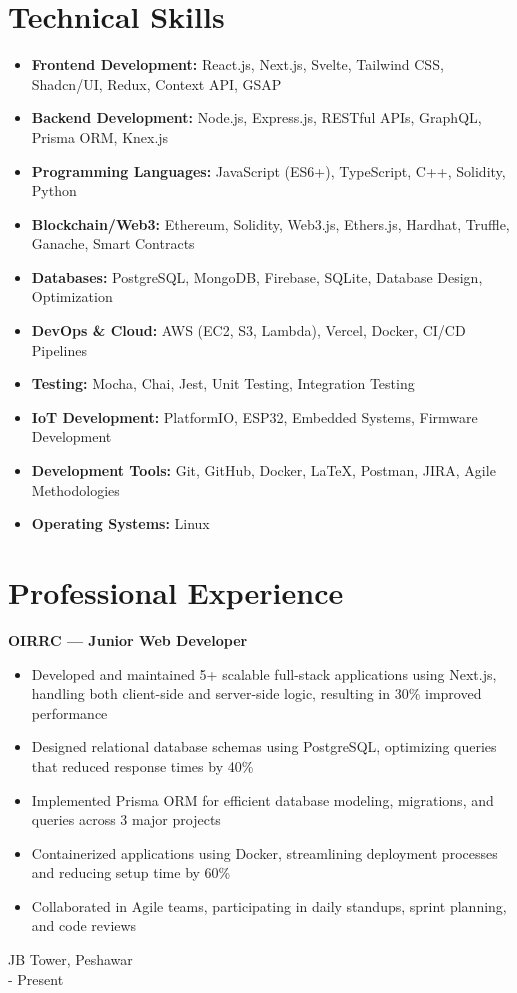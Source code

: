 \documentclass[10pt, letterpaper]{article}
\newenvironment{highlights}{
    \begin{itemize}[
        topsep=0.10 cm,
        parsep=0.10 cm,
        partopsep=0pt,
        itemsep=0pt,
        leftmargin=0.4 cm + 10pt
    ]
}{
    \end{itemize}
}
\newenvironment{twocolentry}[2][]{
    \onecolentry
    \def\secondColumn{#2}
    \setcolumnwidth{\fill, 4.5 cm}
    \begin{paracol}{2}
}{
    \switchcolumn \raggedleft \secondColumn
    \end{paracol}
    \endonecolentry
}
\begin{document}
\section{Technical Skills}
\begin{highlights}
	\item \textbf{Frontend Development:} React.js, Next.js, Svelte, Tailwind CSS, Shadcn/UI, Redux, Context API, GSAP
	\item \textbf{Backend Development:} Node.js, Express.js, RESTful APIs, GraphQL, Prisma ORM, Knex.js
	\item \textbf{Programming Languages:} JavaScript (ES6+), TypeScript, C++, Solidity, Python
	\item \textbf{Blockchain/Web3:} Ethereum, Solidity, Web3.js, Ethers.js, Hardhat, Truffle, Ganache, Smart Contracts
	\item \textbf{Databases:} PostgreSQL, MongoDB, Firebase, SQLite, Database Design, Optimization
	\item \textbf{DevOps \& Cloud:} AWS (EC2, S3, Lambda), Vercel, Docker, CI/CD Pipelines
	\item \textbf{Testing:} Mocha, Chai, Jest, Unit Testing, Integration Testing
	\item \textbf{IoT Development:} PlatformIO, ESP32, Embedded Systems, Firmware Development
	\item \textbf{Development Tools:} Git, GitHub, Docker, LaTeX, Postman, JIRA, Agile Methodologies
	\item \textbf{Operating Systems:} Linux
\end{highlights}

\section{Professional Experience}

\begin{twocolentry}{
		JB Tower, Peshawar \\
		- Present
	}
	\textbf{OIRRC — Junior Web Developer}
	\begin{highlights}
		\item Developed and maintained 5+ scalable full-stack applications using Next.js, handling both client-side and server-side logic, resulting in 30\% improved performance
		\item Designed relational database schemas using PostgreSQL, optimizing queries that reduced response times by 40\%
		\item Implemented Prisma ORM for efficient database modeling, migrations, and queries across 3 major projects
		\item Containerized applications using Docker, streamlining deployment processes and reducing setup time by 60\%
		\item Collaborated in Agile teams, participating in daily standups, sprint planning, and code reviews
	\end{highlights}
\end{twocolentry}
\end{document}
